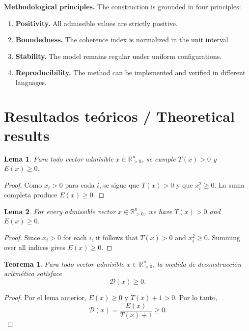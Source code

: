 \documentclass[11pt]{article}
\newtheorem{lemma}{Lema}
\newtheorem{theorem}{Teorema}
\begin{document}
\textbf{Methodological principles.} The construction is grounded in four principles:

\begin{enumerate}[label=\textbf{P\arabic*.}]
\item \textbf{Positivity.} All admissible values are strictly positive.
\item \textbf{Boundedness.} The coherence index is normalized in the unit interval.
\item \textbf{Stability.} The model remains regular under uniform configurations.
\item \textbf{Reproducibility.} The method can be implemented and verified in different languages.
\end{enumerate}

\section{Resultados te\'oricos / Theoretical results}
\begin{lemma}
Para todo vector admisible $x\in\mathbb{R}_{>0}^n$, se cumple $T(x)>0$ y $E(x)\ge 0$.
\end{lemma}
\begin{proof}
Como $x_i>0$ para cada $i$, se sigue que $T(x)>0$ y que $x_i^2\ge 0$. La suma completa produce $E(x)\ge 0$.
\end{proof}

\begin{lemma}
For every admissible vector $x\in\mathbb{R}_{>0}^n$, we have $T(x)>0$ and $E(x)\ge 0$.
\end{lemma}
\begin{proof}
Since $x_i>0$ for each $i$, it follows that $T(x)>0$ and $x_i^2\ge 0$. Summing over all indices gives $E(x)\ge 0$.
\end{proof}

\begin{theorem}
Para todo vector admisible $x\in\mathbb{R}_{>0}^n$, la medida de deconstrucci\'on aritm\'etica satisface
\begin{equation}
\mathcal{D}(x)\ge 0.
\end{equation}
\end{theorem}
\begin{proof}
Por el lema anterior, $E(x)\ge 0$ y $T(x)+1>0$. Por lo tanto,
\begin{equation}
\mathcal{D}(x)=\frac{E(x)}{T(x)+1}\ge 0.
\end{equation}
\end{proof}
\end{document}
